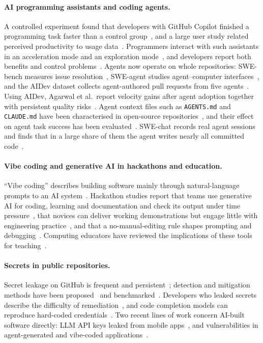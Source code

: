 \documentclass{article}
\begin{document}
\paragraph{AI programming assistants and coding agents.}
A controlled experiment found that developers with GitHub Copilot finished a programming task faster than a control group~\cite{peng2023copilot}, and a large user study related perceived productivity to usage data~\cite{ziegler2024copilot}. Programmers interact with such assistants in an acceleration mode and an exploration mode~\cite{barke2023grounded}, and developers report both benefits and control problems~\cite{liang2024usability}. Agents now operate on whole repositories: SWE-bench measures issue resolution~\cite{jimenez2023swebench}, SWE-agent studies agent--computer interfaces~\cite{yang2024sweagent}, and the AIDev dataset collects agent-authored pull requests from five agents~\cite{li2025aidev}. Using AIDev, Agarwal et al.\ report velocity gains after agent adoption together with persistent quality risks~\cite{agarwal2026aiides}. Agent context files such as \texttt{AGENTS.md} and \texttt{CLAUDE.md} have been characterised in open-source repositories~\cite{chatlatanagulchai2025agentreadmes}, and their effect on agent task success has been evaluated~\cite{gloaguen2026agentsmd}. SWE-chat records real agent sessions and finds that in a large share of them the agent writes nearly all committed code~\cite{baumann2026swechat}.

\paragraph{Vibe coding and generative AI in hackathons and education.}
``Vibe coding'' describes building software mainly through natural-language prompts to an AI system~\cite{gama2025vibes,waseem2025vibepractice}. Hackathon studies report that teams use generative AI for coding, learning and documentation and check its output under time pressure~\cite{zhou2026quickbuild}, that novices can deliver working demonstrations but engage little with engineering practice~\cite{gama2025vibes}, and that a no-manual-editing rule shapes prompting and debugging~\cite{chen2026codeforall}. Computing educators have reviewed the implications of these tools for teaching~\cite{prather2023robots,denny2024computinged}.

\paragraph{Secrets in public repositories.}
Secret leakage on GitHub is frequent and persistent~\cite{meli2019git}; detection and mitigation methods have been proposed~\cite{sinha2015secretkeys} and benchmarked~\cite{basak2023secretbench}. Developers who leaked secrets describe the difficulty of remediation~\cite{krause2022pushed}, and code completion models can reproduce hard-coded credentials~\cite{huang2024codesecret}. Two recent lines of work concern AI-built software directly: LLM API keys leaked from mobile apps~\cite{gao2026mindyourkey}, and vulnerabilities in agent-generated and vibe-coded applications~\cite{zhao2025vibesafe,deng2026vibeinsecurity}.
\end{document}
